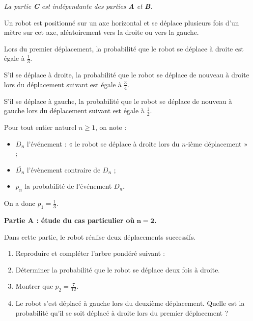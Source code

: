 \textit{La partie \textbf{C} est indépendante des parties \textbf{A} et \textbf{B}.} 

\medskip

Un robot est positionné sur un axe horizontal et se déplace plusieurs fois d'un mètre sur cet axe, aléatoirement vers la droite ou vers la gauche.

Lors du premier déplacement, la probabilité que le robot se déplace à droite est égale à $\frac{1}{3}$.

S'il se déplace à droite, la probabilité que le robot se déplace de nouveau à droite lors du déplacement suivant est égale à $\frac{3}{4}$.

S'il se déplace à gauche, la probabilité que le robot se déplace de nouveau à gauche lors du déplacement suivant est égale à $\frac{1}{2}$.

\smallskip

Pour tout entier naturel $n \geqslant 1$, on note :

\begin{itemize}
	\item $D_n$ l'événement : « le robot se déplace à droite lors du $n$-ième déplacement » ;
	\item $\overline{D_n}$ l'évènement contraire de $D_n$ ;
	\item $p_n$ la probabilité de l'événement $D_n$.
\end{itemize}

On a donc $p_1 = \frac{1}{3}$.

\medskip

\begin{Centrage}
	\textbf{Partie A : étude du cas particulier où} $\bm{n=2}$\textbf{.}
\end{Centrage}

Dans cette partie, le robot réalise deux déplacements successifs.

\begin{enumerate}
	\item Reproduire et compléter l'arbre pondéré suivant :
	
	\begin{Centrage}
	\end{Centrage}
	\item Déterminer la probabilité que le robot se déplace deux fois à droite.
	\item Montrer que $p_2 = \frac{7}{12}$.
	\item Le robot s'est déplacé à gauche lors du deuxième déplacement. Quelle est la probabilité qu'il se soit déplacé à droite lors du premier déplacement ?
\end{enumerate}

